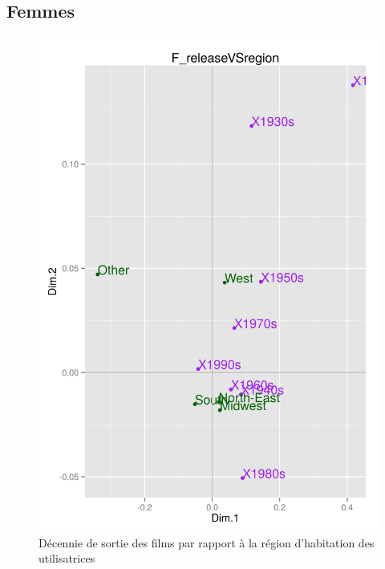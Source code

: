 \documentclass[11pt]{article}
\begin{document}
\subsection{Femmes}
\begin{figure}[htd]
\centering
\includegraphics[scale=0.65]{./images/F_releaseVSregion}
\caption{Décennie de sortie des films par rapport à la région d'habitation des utilisatrices}
\end{figure}

\pagebreak
\end{document}

